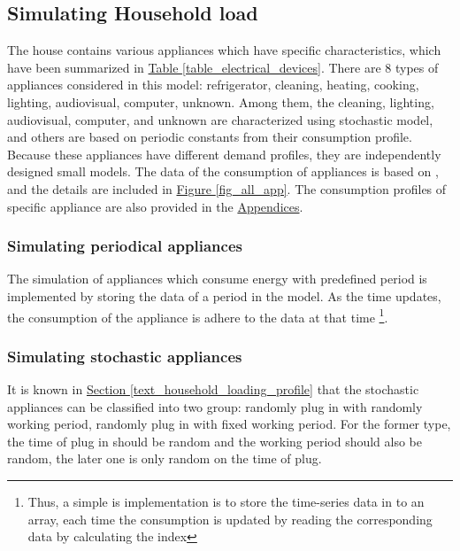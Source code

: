 \documentclass[12pt,a4paper]{report}
\begin{document}
                \subsection{Simulating Household load}
                \label{text_simulatinghouseholdload}
                The house contains various appliances which have specific characteristics, which have been summarized in \hyperref[table_electrical_devices]{Table \ref*{table_electrical_devices}}. There are 8 types of appliances considered in this model: refrigerator, cleaning, heating, cooking, lighting, audiovisual, computer, unknown. Among them, the cleaning, lighting, audiovisual, computer, and unknown are characterized using stochastic model, and others are based on periodic constants from their consumption profile.
                Because these appliances have different demand profiles, they are independently designed small models.
                The data of the consumption of appliances is based on \cite{report:household}, and the details are included in \hyperref[fig_all_app]{Figure \ref*{fig_all_app}}. The consumption profiles of specific appliance are also provided in the \hyperref[text_appendices]{Appendices}.

                \subsubsection{Simulating periodical appliances}
                The simulation of appliances which consume energy with predefined period is implemented by storing the data of a period in the model. As the time updates, the consumption of the appliance is adhere to the data at that time \footnote{Thus, a simple is implementation is to store the time-series data in to an array, each time the consumption is updated by reading the corresponding data by calculating the index}. 
                \subsubsection{Simulating stochastic appliances}
                It is known in \hyperref[text_household_loading_profile]{Section \ref*{text_household_loading_profile}} that the stochastic appliances can be classified into two group: randomly plug in with randomly working period, randomly plug in with fixed working period. For the former type, the time of plug in should be random and the working period should also be random, the later one is only random on the time of plug. 
\end{document}
